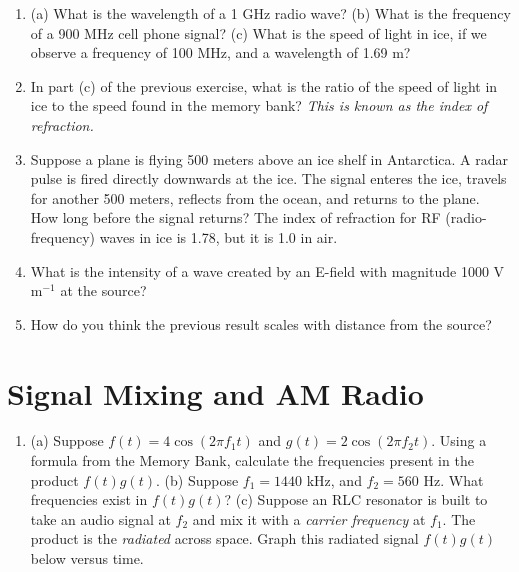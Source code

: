 \documentclass{article}
\begin{document}
\begin{enumerate}
\item (a) What is the wavelength of a 1 GHz radio wave? (b) What is the frequency of a 900 MHz cell phone signal? (c) What is the speed of light in ice, if we observe a frequency of 100 MHz, and a wavelength of 1.69 m? \\ \vspace{2.5cm}
\item In part (c) of the previous exercise, what is the ratio of the speed of light in ice to the speed found in the memory bank? \textit{This is known as the index of refraction.}\\ \vspace{2.5cm}
\item Suppose a plane is flying 500 meters above an ice shelf in Antarctica.  A radar pulse is fired directly downwards at the ice.  The signal enteres the ice, travels for another 500 meters, reflects from the ocean, and returns to the plane.  How long before the signal returns?  The index of refraction for RF (radio-frequency) waves in ice is 1.78, but it is 1.0 in air. \\ \vspace{2.5cm}
\item What is the intensity of a wave created by an E-field with magnitude 1000 V m$^{-1}$ at the source? \\ \vspace{2cm}
\item How do you think the previous result scales with distance from the source? \\ \vspace{2.5cm}
\end{enumerate}

\section{Signal Mixing and AM Radio}

\begin{enumerate}
\item (a) Suppose $f(t) = 4\cos(2\pi f_1 t)$ and $g(t) = 2\cos(2\pi f_2 t)$.  Using a formula from the Memory Bank, calculate the frequencies present in the product $f(t) g(t)$. (b) Suppose $f_1 = 1440$ kHz, and $f_2 = 560$ Hz.  What frequencies exist in $f(t) g(t)$? (c) Suppose an RLC resonator is built to take an audio signal at $f_2$ and mix it with a \textit{carrier frequency} at $f_1$.  The product is the \textit{radiated} across space.  Graph this radiated signal $f(t) g(t)$ below versus time.
\end{enumerate}
\end{document}
